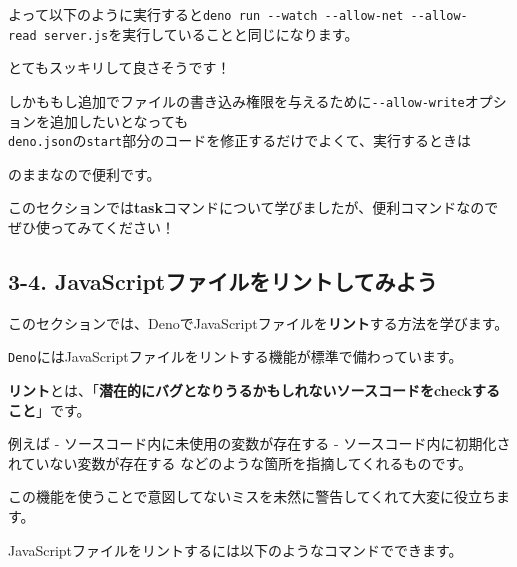 よって以下のように実行すると\texttt{deno\ run\ -\/-watch\ -\/-allow-net\ -\/-allow-read\ server.js}を実行していることと同じになります。

\begin{Shaded}
\begin{Highlighting}[]
\end{Highlighting}
\end{Shaded}

とてもスッキリして良さそうです！

しかももし追加でファイルの書き込み権限を与えるために\texttt{-\/-allow-write}オプションを追加したいとなっても\\
\texttt{deno.json}の\texttt{start}部分のコードを修正するだけでよくて、実行するときは

\begin{Shaded}
\begin{Highlighting}[]
\end{Highlighting}
\end{Shaded}

のままなので便利です。

このセクションでは\textbf{task}コマンドについて学びましたが、便利コマンドなのでぜひ使ってみてください！

\subsection{3-4.
JavaScriptファイルをリントしてみよう}\label{javascriptux30d5ux30a1ux30a4ux30ebux3092ux30eaux30f3ux30c8ux3057ux3066ux307fux3088ux3046}

このセクションでは、DenoでJavaScriptファイルを\textbf{リント}する方法を学びます。

\texttt{Deno}にはJavaScriptファイルをリントする機能が標準で備わっています。

\textbf{リント}とは、「\textbf{潜在的にバグとなりうるかもしれないソースコードをcheckすること}」です。

例えば - ソースコード内に未使用の変数が存在する -
ソースコード内に初期化されていない変数が存在する
などのような箇所を指摘してくれるものです。

この機能を使うことで意図してないミスを未然に警告してくれて大変に役立ちます。

JavaScriptファイルをリントするには以下のようなコマンドでできます。

\begin{Shaded}
\begin{Highlighting}[]
\end{Highlighting}
\end{Shaded}

